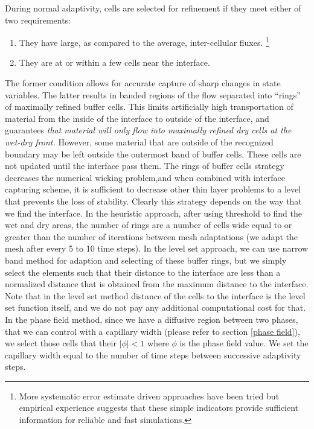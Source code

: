 \documentclass[letterpaper,10pt]{article}
\begin{document}
During normal adaptivity, cells are selected for refinement if they meet 
either of two requirements:
\begin{enumerate} 
\item They have large, as compared to the average, inter-cellular fluxes. \footnote{More systematic error estimate driven approaches have been tried \cite{} but 
empirical experience suggests that these simple indicators   provide sufficient information for reliable and fast simulations.}
\item They are at or within a few cells near the interface.
\end{enumerate}
The former condition allows for accurate capture of sharp changes in state variables. The latter results in banded regions of the flow separated into ``rings'' of maximally refined buffer cells.  This limits artificially high transportation of material from the inside of the interface to outside of the interface, and guarantees {\it that material will only flow into maximally refined dry cells at the wet-dry front.  }
However, some material that are outside of the recognized boundary may be left outside the outermost band of buffer cells. These cells are not updated until the interface pass them.
The rings of buffer cells strategy decreases the numerical wicking problem,and when combined with interface capturing scheme, it is sufficient to decrease other thin layer problems to a level that prevents the loss of stability.
Clearly this strategy depends on the way that we find the interface. In  the heuristic approach, after using threshold to find the wet and dry areas, the number of rings are a number of cells wide equal to or greater than the number of iterations between mesh adaptations (we adapt the mesh after every 5 to 10 time steps). In the level set approach, we can use narrow band method for adaption and selecting of these buffer rings, but we simply select the elements such that their distance to the interface are less than a normalized distance that is obtained from the maximum distance to the interface. Note that in the level set method distance of the cells to the interface is the level set function itself, and we do not pay any additional computational cost for that. In the phase field method, since we have a diffusive region between two phases, that we can control  with a capillary width (please refer to section \ref{phase field}), we select those cells that their $|\phi| <1 $ where $\phi$ is the phase field value. We set the capillary width equal to the number of time steps between successive adaptivity steps.
\end{document}
